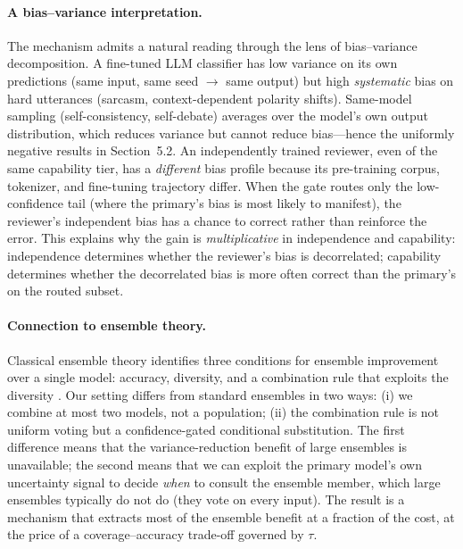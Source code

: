 \documentclass[final,5p,times,twocolumn]{elsarticle}
\begin{document}
\paragraph{A bias--variance interpretation.}
The mechanism admits a natural reading through the lens of bias--variance
decomposition. A fine-tuned LLM classifier has low variance on its own
predictions (same input, same seed $\to$ same output) but high
\emph{systematic} bias on hard utterances (sarcasm, context-dependent
polarity shifts). Same-model sampling (self-consistency, self-debate)
averages over the model's own output distribution, which reduces variance
but cannot reduce bias---hence the uniformly negative results in
Section~5.2. An independently trained reviewer, even of the same capability
tier, has a \emph{different} bias profile because its pre-training corpus,
tokenizer, and fine-tuning trajectory differ. When the gate routes only the
low-confidence tail (where the primary's bias is most likely to manifest),
the reviewer's independent bias has a chance to correct rather than
reinforce the error. This explains why the gain is \emph{multiplicative} in
independence and capability: independence determines whether the reviewer's
bias is decorrelated; capability determines whether the decorrelated bias
is more often correct than the primary's on the routed subset.

\paragraph{Connection to ensemble theory.}
Classical ensemble theory \citep{dietterich2000ensemble} identifies three
conditions for ensemble improvement over a single model: accuracy,
diversity, and a combination rule that exploits the diversity
\citep{kuncheva2003measures,brown2005diversity}. Our setting
differs from standard ensembles in two ways: (i) we combine at most two
models, not a population; (ii) the combination rule is not uniform voting
but a confidence-gated conditional substitution. The first difference means
that the variance-reduction benefit of large ensembles is unavailable; the
second means that we can exploit the primary model's own uncertainty signal
to decide \emph{when} to consult the ensemble member, which large ensembles
typically do not do (they vote on every input). The result is a mechanism
that extracts most of the ensemble benefit at a fraction of the cost, at
the price of a coverage--accuracy trade-off governed by $\tau$.
\end{document}
